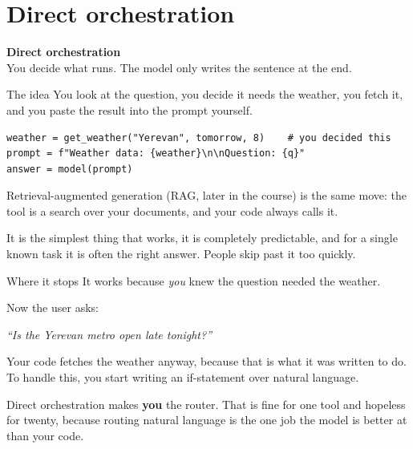 \documentclass[aspectratio=169]{beamer}
\newcommand{\trapbox}[1]{%
  \begin{tcolorbox}[colback=armred!8, colframe=armred, boxrule=0.6pt, arc=2pt]
  #1
  \end{tcolorbox}}
\newcommand{\takebox}[1]{%
  \begin{tcolorbox}[colback=paramgreen!8, colframe=paramgreen, boxrule=0.6pt, arc=2pt]
  #1
  \end{tcolorbox}}
\newcommand{\sectiontransition}[2]{%
  \begin{frame}[plain]
    \vfill
    \begin{center}
      {\Huge\bfseries\color{popblue} #1}\\[1.1em]
      {\large #2}
    \end{center}
    \vfill
  \end{frame}}
\begin{document}
\section{Direct orchestration}
\sectiontransition{Direct orchestration}{You decide what runs. The model only writes the
sentence at the end.}

\begin{frame}[fragile]{The idea}
  \vspace{0.7em}
  You look at the question, you decide it needs the weather, you fetch it, and you paste the
  result into the prompt yourself.

  \begin{lstlisting}
weather = get_weather("Yerevan", tomorrow, 8)    # you decided this
prompt = f"Weather data: {weather}\n\nQuestion: {q}"
answer = model(prompt)
\end{lstlisting}

  \vspace{0.5em}
  \takebox{Retrieval-augmented generation (RAG, later in the course) is the same move: the tool is
  a search over your documents, and your code always calls it.}

  \vspace{0.6em}
  {\small It is the simplest thing that works, it is completely predictable, and for a single
  known task it is often the right answer. People skip past it too quickly.}
\end{frame}

\begin{frame}{Where it stops}
  \vspace{0.8em}
  It works because \emph{you} knew the question needed the weather.

  \vspace{0.9em}
  Now the user asks:

  \vspace{0.5em}
  \begin{center}
  \begin{tcolorbox}[colback=lightbg, colframe=gray, boxrule=0.5pt, arc=2pt, width=0.82\textwidth]
    \centering\textit{``Is the Yerevan metro open late tonight?''}
  \end{tcolorbox}
  \end{center}

  \vspace{0.8em}
  Your code fetches the weather anyway, because that is what it was written to do. To handle this,
  you start writing an if-statement over natural language.

  \vspace{0.7em}
  \trapbox{Direct orchestration makes \textbf{you} the router. That is fine for one tool and
  hopeless for twenty, because routing natural language is the one job the model is better at
  than your code.}
\end{frame}
\end{document}
